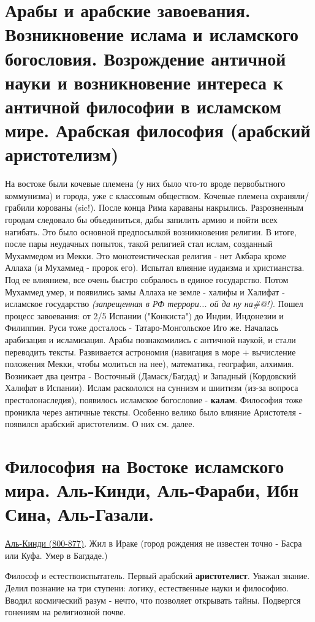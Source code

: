 \section{Арабы и арабские завоевания. Возникновение ислама и исламского богословия. Возрождение античной науки и возникновение интереса к античной философии в исламском мире. Арабская философия (арабский аристотелизм)}
На востоке были кочевые племена (у них было что-то вроде первобытного коммунизма) и города, уже с классовым обществом.
Кочевые племена охраняли/грабили корованы (sic!). После конца Рима караваны накрылись.
Разрозненным городам следовало бы объединиться, дабы запилить армию и пойти всех нагибать. 
Это было основной предпосылкой возникновения религии. 
В итоге, после пары неудачных попыток, такой религией стал ислам, созданный Мухаммедом из Мекки.
Это монотеистическая религия - нет Акбара кроме Аллаха (и Мухаммед - пророк его). 
Испытал влияние иудаизма и христианства. 
Под ее влиянием, все очень быстро собралось в единое государство. Потом Мухаммед умер, и появились замы Аллаха не земле - халифы и Халифат - исламское государство \textit{(запрещенная в РФ террори... ой да ну на\#@!)}. 
Пошел процесс завоевания: от 2/5 Испании ("Конкиста") до Индии, Индонезии и Филиппин.
Руси тоже досталось - Татаро-Монгольское Иго же. 
Началась арабизация и исламизация. 
Арабы познакомились с античной наукой, и стали переводить тексты. 
Развивается астрономия (навигация в море + вычисление положения Мекки, чтобы молиться на нее), математика, география, алхимия. 
Возникает два центра - Восточный (Дамаск/Багдад) и Западный (Кордовский Халифат в Испании).
Ислам раскололся на суннизм и шиитизм (из-за вопроса престолонаследия), появилось исламское богословие - \textbf{калам}. 
Философия тоже проникла через античные тексты. Особенно велико было влияние Аристотеля - появился арабский аристотелизм. О них см. далее.

\section{Философия на Востоке исламского мира. Аль-Кинди, Аль-Фараби, Ибн Сина, Аль-Газали.}
\underline{Аль-Кинди (800-877)}. Жил в Ираке (город рождения не известен точно - Басра или Куфа. Умер в Багдаде.)

Философ и естествоиспытатель. Первый арабский \textbf{аристотелист}. Уважал знание. Делил познание на три ступени: логику, естественные науки и философию. Вводил космический разум - нечто, что позволяет открывать тайны. Подвергся гонениям на религиозной почве.

